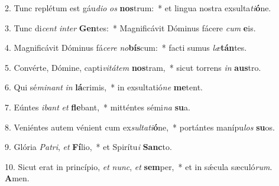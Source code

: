 2. Tunc replétum est gáu\textit{di}\textit{o} \textit{os} \textbf{nos}trum:~*  et lingua nostra exsulta\textit{ti}\textbf{ó}ne.\

3. Tunc di\textit{cent} \textit{in}\textit{ter} \textbf{Gen}tes:~*  Magnificávit Dóminus fácere \textit{cum} \textbf{e}is.\

4. Magnificávit Dóminus fá\textit{ce}\textit{re} \textit{no}\textbf{bís}cum:~*  facti sumus \textit{læ}\textbf{tán}tes.\

5. Convérte, Dómine, capti\textit{vi}\textit{tá}\textit{tem} \textbf{nos}tram,~*  sicut torrens \textit{in} \textbf{aus}tro.\

6. Qui sé\textit{mi}\textit{nant} \textit{in} \textbf{lá}crimis,~*  in exsultatió\textit{ne} \textbf{me}tent.\

7. Eúntes \textit{i}\textit{bant} \textit{et} \textbf{fle}bant,~*  mitténtes sémi\textit{na} \textbf{su}a.\

8. Veniéntes autem vénient cum ex\textit{sul}\textit{ta}\textit{ti}\textbf{ó}ne,~*  portántes manípu\textit{los} \textbf{su}os.\

9. Glória \textit{Pa}\textit{tri}, \textit{et} \textbf{Fí}lio,~*  et Spirítu\textit{i} \textbf{Sanc}to.\

10. Sicut erat in princípio, \textit{et} \textit{nunc}, \textit{et} \textbf{sem}per,~*  et in sǽcula sæculó\textit{rum}. \textbf{A}men.\

